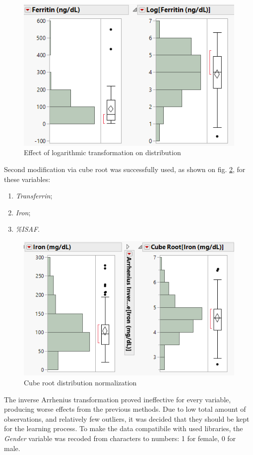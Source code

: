 	\begin{figure}[!ht]
		\centering
		\includegraphics[width=0.6\linewidth]{Rozdzial3/log2}
		\caption{Effect of logarithmic transformation on distribution}
		\label{fig:log2}
	\end{figure}

	Second modification via cube root was successfully used, as shown on fig. \ref{fig:cube2}, for these variables:
	
	\begin{enumerate}
		\item \textit{Transferrin};
		\item \textit{Iron};
		\item \textit{\%ISAF}.
	\end{enumerate}

	\begin{figure}
		\centering
		\includegraphics[width=0.6\linewidth]{Rozdzial3/cube2}
		\caption{Cube root distribution normalization}
		\label{fig:cube2}
	\end{figure}

	The inverse Arrhenius transformation proved ineffective for every variable, producing worse effects from the previous methods. Due to low total amount of observations, and relatively few outliers, it was decided that they should be kept for the learning process. To make the data compatibile with used libraries, the \textit{Gender} variable was recoded from characters to numbers: 1 for female, 0 for male.

